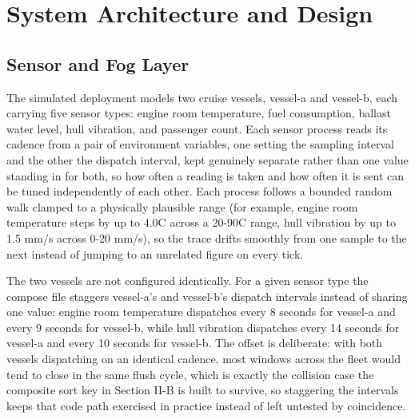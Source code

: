 \documentclass[conference]{IEEEtran}
\begin{document}
\section{System Architecture and Design}

\subsection{Sensor and Fog Layer}
The simulated deployment models two cruise vessels, vessel-a and vessel-b, each carrying five sensor types: engine room temperature, fuel consumption, ballast water level, hull vibration, and passenger count. Each sensor process reads its cadence from a pair of environment variables, one setting the sampling interval and the other the dispatch interval, kept genuinely separate rather than one value standing in for both, so how often a reading is taken and how often it is sent can be tuned independently of each other. Each process follows a bounded random walk clamped to a physically plausible range (for example, engine room temperature steps by up to 4.0\textdegree{}C across a 20-90\textdegree{}C range, hull vibration by up to 1.5 mm/s across 0-20 mm/s), so the trace drifts smoothly from one sample to the next instead of jumping to an unrelated figure on every tick.

The two vessels are not configured identically. For a given sensor type the compose file staggers vessel-a's and vessel-b's dispatch intervals instead of sharing one value: engine room temperature dispatches every 8 seconds for vessel-a and every 9 seconds for vessel-b, while hull vibration dispatches every 14 seconds for vessel-a and every 10 seconds for vessel-b. The offset is deliberate: with both vessels dispatching on an identical cadence, most windows across the fleet would tend to close in the same flush cycle, which is exactly the collision case the composite sort key in Section II-B is built to survive, so staggering the intervals keeps that code path exercised in practice instead of left untested by coincidence.
\end{document}
